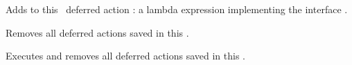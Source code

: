 \item[\tx{void }\textbf{actAdd}\tx{(FuncVV act)}]\upsp \newline
   Adds to this \Phrase\ deferred action : a lambda expression implementing 
   the interface .
   
\item[\tx{void }\textbf{actClear}\tx{()}]\upsp \newline
   Removes all deferred actions saved in this \Phrase.
   
\item[\tx{void }\textbf{actExec}\tx{()}]\upsp \newline
   Executes and removes all deferred actions saved in this \Phrase.

\eul
